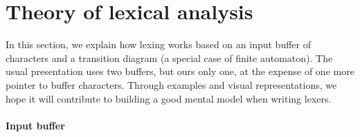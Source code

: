 \section{Theory of lexical analysis}

In this section, we explain how lexing works based on an input buffer
of characters and a transition diagram (a special case of finite
automaton). The usual presentation uses two buffers, but ours only
one, at the expense of one more pointer to buffer characters. Through
examples and visual representations, we hope it will contribute to
building a good mental model when writing lexers.

\paragraph{Input buffer}

